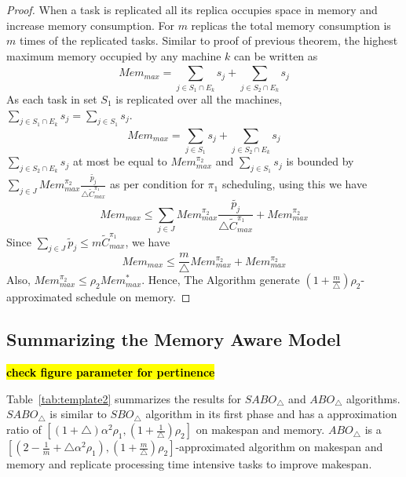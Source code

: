 \documentclass[twocolumn]{svjour3}
\newcommand{\todo}[1]{{\color{red}\textbf{\hl{#1}}\xspace}}
\begin{document}
\begin{proof}           
  When a task is replicated all its replica occupies space in memory
  and increase memory consumption. For $m$ replicas the total memory
  consumption is $m$ times of the replicated tasks. Similar to proof
  of previous theorem, the highest maximum memory occupied by any
  machine $k$ can be written as
  \begin{equation}\nonumber
    Mem_{max}= \sum_{j \in S_1\cap E_k}^{}s_j+\sum_{j \in S_2\cap E_k}^{}s_j           
  \end{equation}
  As each task in set $S_1$ is replicated over all the
  machines,$\sum\limits _{j \in S_1\cap E_k}^{}s_j =\sum\limits _{j
    \in S_1}^{}s_j$.
  \begin{equation}\nonumber
    Mem_{max} = \sum_{j\in S_1}^{}s_j+\sum_{j \in S_2\cap E_k}^{}s_j           
  \end{equation}    
  $\sum\limits_{j \in S_2\cap E_k}^{}s_j$ at most be equal to
  $Mem^{\pi_2}_{max} $ and $\sum\limits_{j\in S_1}s_j$ is bounded by
  $\sum\limits_{j \in J}^{} {Mem^{\pi_2}_{max}}
  \frac{\tilde{p_j}}{\triangle \tilde{C}^{\pi_1}_{max}} $ as per
  condition for $\pi_1$ scheduling, using this we have
  \begin{equation}\nonumber
    Mem_{max}\leq \sum_{j \in J}^{} {Mem^{\pi_2}_{max}} \frac{\tilde{p_j}}{\triangle \tilde{C}^{\pi_1}_{max}}+{Mem^{\pi_2}_{max}}
  \end{equation}
  Since $ \sum\limits_{j \in J}\tilde{p}_j \leq m\tilde{C}^{\pi_1}_{max} $, we have 
  \begin{equation}\nonumber
    Mem_{max}\leq   \frac{m}{\triangle}{Mem^{\pi_2}_{max}}+{Mem^{\pi_2}_{max}}
  \end{equation}
  Also,  ${Mem^{\pi_2}_{max}} \leq \rho_2 {Mem^{*}_{max}}$.  Hence, The Algorithm generate $ (1+\frac{m}{\triangle})\rho_2 $- approximated schedule on memory.
\end{proof}
                  
\subsection{Summarizing the Memory Aware Model}
\todo{check figure parameter for pertinence}

Table~\ref{tab:template2} summarizes the results for $SABO_\triangle$
and $ABO_\triangle$ algorithms. $SABO_\triangle$ is similar to $
SBO_\triangle$ algorithm in its first phase and has a approximation
ratio of $[(1+\triangle)\alpha^2 \rho_1,
(1+\frac{1}{\triangle})\rho_2]$ on makespan and memory.
$ABO_\triangle$ is a $ [(2-\frac{1}{m}+\triangle\alpha^2 \rho_1),
(1+\frac{m}{\triangle})\rho_2] $-approximated algorithm on makespan
and memory and replicate processing time intensive tasks to improve
makespan.
     
\end{document}
